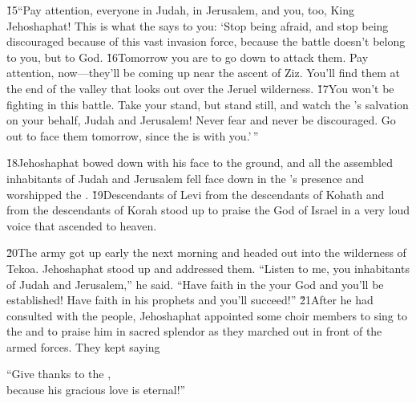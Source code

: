 \begin{poetry}
\poeml \v{15}``Pay attention, everyone in Judah, in Jerusalem, and you, too, King Jehoshaphat! This is what the  says to you: `Stop being afraid, and stop being discouraged because of this vast invasion force, because the battle doesn't belong to you, but to God. \v{16}Tomorrow you are to go down to attack them. Pay attention, now---they'll be coming up near the ascent of Ziz. You'll find them at the end of the valley that looks out over the Jeruel wilderness. \v{17}You won't be fighting in this battle. Take your stand, but stand still, and watch the 's salvation on your behalf, Judah and Jerusalem! Never fear and never be discouraged. Go out to face them tomorrow, since the  is with you.'\,''
\end{poetry}

\v{18}Jehoshaphat bowed down with his face to the ground, and all the assembled inhabitants of Judah and Jerusalem fell face down in the 's presence and worshipped the . \v{19}Descendants of Levi from the descendants of Kohath and from the descendants of Korah stood up to praise the  God of Israel in a very loud voice that ascended to heaven.

\v{20}The army got up early the next morning and headed out into the wilderness of Tekoa. Jehoshaphat stood up and addressed them. ``Listen to me, you inhabitants of Judah and Jerusalem,'' he said. ``Have faith in the  your God and you'll be established! Have faith in his prophets and you'll succeed!'' \v{21}After he had consulted with the people, Jehoshaphat appointed some choir members to sing to the  and to praise him in sacred splendor as they marched out in front of the armed forces. They kept saying

\begin{poetry}
\poeml ``Give thanks to the , \\
\poemll    because his gracious love is eternal!''
\end{poetry}

